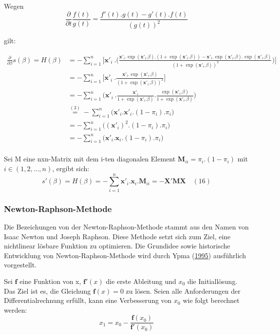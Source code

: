 \documentclass[12pt,]{article}
\begin{document}
Wegen \[
\frac{\partial}{\partial t} \frac{f(t)}{g(t)} = \frac{f'(t).g(t) - g'(t).f(t)}{(g(t))^2}
\]

gilt:

\[
\begin{aligned}
\frac{\partial}{\partial \beta} s(\beta) = H(\beta) &= - \sum_{i = 1}^{n} \Bigg[ \mathbf{x'}_i \ . \Bigg( \frac{\mathbf{x'}_i.\exp(\mathbf{x'}_i.\beta).(1+\exp(\mathbf{x'}_i.\beta))-\mathbf{x'}_i.\exp(\mathbf{x'}_i.\beta).\exp(\mathbf{x'}_i.\beta)}{(1+\exp(\mathbf{x'}_i.\beta))^2} \Bigg) \Bigg] \\
&= - \sum_{i = 1}^{n} \Bigg[ \mathbf{x'}_i \ . \frac{\mathbf{x'}_i.\exp(\mathbf{x'}_i.\beta)}{(1+\exp(\mathbf{x'}_i.\beta))^2}  \Bigg] \\
&= - \sum_{i = 1}^{n} \Bigg( \mathbf{x'}_i \ . \frac{\mathbf{x'}_i}{1+\exp(\mathbf{x'}_i.\beta)} . \frac{\exp(\mathbf{x'}_i.\beta)}{1+\exp(\mathbf{x'}_i.\beta)} \Bigg) \\
&\mathrel{\overset{(3)}{=}} - \sum_{i = 1}^{n} \Big( \mathbf{x'}_i . \mathbf{x'}_i . (1-\pi_i) . \pi_i \Big) \\
&= - \sum_{i = 1}^{n} \Big( (\mathbf{x'}_i)^2 . (1-\pi_i) . \pi_i \Big) \\
&= - \sum_{i = 1}^{n} \Big( \mathbf{x'}_i.\mathbf{x}_i . (1-\pi_i) . \pi_i \Big) \quad \\
\end{aligned}
\]

Sei M eine nxn-Matrix mit dem i-ten diagonalen Element
\(\mathbf{M}_{ii} = \pi_i.(1-\pi_i)\) mit \(i \in (1,2,...,n)\), ergibt
sich: \[
s'(\beta) = H(\beta) = - \sum_{i = 1}^{n} \mathbf{x'}_i.\mathbf{x}_i . \mathbf{M}_{ii} = - \mathbf{X}'\mathbf{M}\mathbf{X} \quad (16)
\]

\subsubsection{Newton-Raphson-Methode}\label{newton-raphson-methode}

Die Bezeichungen von der Newton-Raphson-Methode stammt aus den Namen von
Isaac Newton und Joseph Raphson. Diese Methode setzt sich zum Ziel, eine
nichtlinear lösbare Funktion zu optimieren. Die Grundidee sowie
historische Entwicklung von Newton-Raphson-Methode wird durch Ypma
(\protect\hyperlink{ref-ypma1995historical}{1995}) ausführlich
vorgestellt.

Sei \(\mathbf{f}\) eine Funktion von x, \(\mathbf{f'}(x)\) die erste
Ableitung und \(x_0\) die Initiallösung. Das Ziel ist es, die Gleichung
\(\mathbf{f}(x) = 0\) zu lösen. Seien alle Anforderungen der
Differentialrechnung erfüllt, kann eine Verbesserung von \(x_0\) wie
folgt berechnet werden: \[
x_1 = x_0 - \frac{\mathbf{f}(x_0)}{\mathbf{f'}(x_0)}
\]
\end{document}
